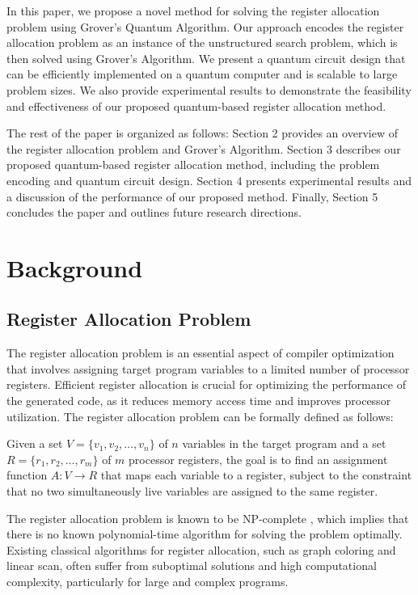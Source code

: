 In this paper, we propose a novel method for solving the register allocation problem using Grover's Quantum Algorithm. Our approach encodes the register allocation problem as an instance of the unstructured search problem, which is then solved using Grover's Algorithm. We present a quantum circuit design that can be efficiently implemented on a quantum computer and is scalable to large problem sizes. We also provide experimental results to demonstrate the feasibility and effectiveness of our proposed quantum-based register allocation method.

The rest of the paper is organized as follows: Section 2 provides an overview of the register allocation problem and Grover's Algorithm. Section 3 describes our proposed quantum-based register allocation method, including the problem encoding and quantum circuit design. Section 4 presents experimental results and a discussion of the performance of our proposed method. Finally, Section 5 concludes the paper and outlines future research directions.

\section{Background}

\subsection{Register Allocation Problem}

The register allocation problem is an essential aspect of compiler optimization that involves assigning target program variables to a limited number of processor registers. Efficient register allocation is crucial for optimizing the performance of the generated code, as it reduces memory access time and improves processor utilization. The register allocation problem can be formally defined as follows:

Given a set $V = \{v_1, v_2, \dots, v_n\}$ of $n$ variables in the target program and a set $R = \{r_1, r_2, \dots, r_m\}$ of $m$ processor registers, the goal is to find an assignment function $A: V \rightarrow R$ that maps each variable to a register, subject to the constraint that no two simultaneously live variables are assigned to the same register.

The register allocation problem is known to be NP-complete \cite{NPComplete}, which implies that there is no known polynomial-time algorithm for solving the problem optimally. Existing classical algorithms for register allocation, such as graph coloring and linear scan, often suffer from suboptimal solutions and high computational complexity, particularly for large and complex programs.


